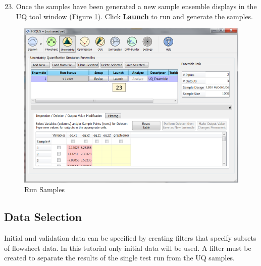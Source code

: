 \begin{enumerate}
\setcounter{enumi}{22}
\item Once the samples have been generated a new sample ensemble displays in the UQ tool window (Figure \ref{fig.tut.sur.new.uq.sample3}).  Click \textbf{\underline{Launch}} to run and generate the samples.
\end{enumerate}
\begin{figure}[H]
	\begin{center}
		\includegraphics[scale=0.55]{Chapt_surrogates/figs/uqSample3}
		\caption{Run Samples}
		\label{fig.tut.sur.new.uq.sample3}
	\end{center}
\end{figure}

\subsection{Data Selection}

Initial and validation data can be specified by creating filters that specify subsets of flowsheet data. In this tutorial only initial data will be used. A filter must be created to separate the results of the single test run from the UQ samples.

